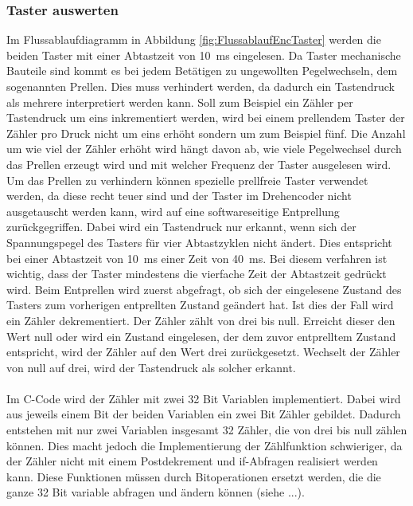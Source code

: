 \subsubsection{Taster auswerten}\label{sec:Taster}
Im Flussablaufdiagramm in Abbildung \ref{fig:FlussablaufEncTaster} werden die beiden Taster mit einer Abtastzeit von \SI{10}{\milli\second} eingelesen. Da Taster mechanische Bauteile sind kommt es bei jedem Betätigen zu ungewollten Pegelwechseln, dem sogenannten Prellen. Dies muss verhindert werden, da dadurch ein Tastendruck als mehrere interpretiert werden kann. Soll zum Beispiel ein Zähler per Tastendruck um eins inkrementiert werden, wird bei einem prellendem Taster der Zähler pro Druck nicht um eins erhöht sondern um zum Beispiel fünf. Die Anzahl um wie viel der Zähler erhöht wird hängt davon ab, wie viele Pegelwechsel durch das Prellen erzeugt wird und mit welcher Frequenz der Taster ausgelesen wird. Um das Prellen zu verhindern können spezielle prellfreie Taster verwendet werden, da diese recht teuer sind und der Taster im Drehencoder nicht ausgetauscht werden kann, wird auf eine softwareseitige Entprellung zurückgegriffen. Dabei wird ein Tastendruck nur erkannt, wenn sich der Spannungspegel des Tasters für vier Abtastzyklen nicht ändert. Dies entspricht bei einer Abtastzeit von \SI{10}{\milli\second} einer Zeit von \SI{40}{\milli\second}. Bei diesem verfahren ist wichtig, dass der Taster mindestens die vierfache Zeit der Abtastzeit gedrückt wird. Beim Entprellen wird zuerst abgefragt, ob sich der eingelesene Zustand des Tasters zum vorherigen entprellten Zustand geändert hat. Ist dies der Fall wird ein Zähler dekrementiert. Der Zähler zählt von drei bis null. Erreicht dieser den Wert null oder wird ein Zustand eingelesen, der dem zuvor entprelltem Zustand entspricht, wird der Zähler auf den Wert drei zurückgesetzt. Wechselt der Zähler von null auf drei, wird der Tastendruck als solcher erkannt. \\\\Im C-Code wird der Zähler mit zwei 32 Bit Variablen implementiert. Dabei wird aus jeweils einem Bit der beiden Variablen ein zwei Bit Zähler gebildet. Dadurch entstehen mit nur zwei Variablen insgesamt 32 Zähler, die von drei bis null zählen können. Dies macht jedoch die Implementierung der Zählfunktion schwieriger, da der Zähler nicht mit einem Postdekrement und if-Abfragen realisiert werden kann. Diese Funktionen müssen durch Bitoperationen ersetzt werden, die die ganze 32 Bit variable abfragen und ändern können (siehe ...).

